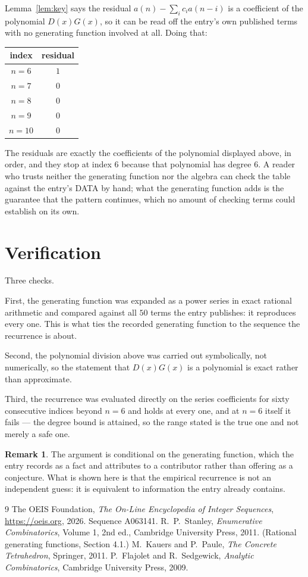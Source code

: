 \documentclass[11pt,a4paper]{article}
\theoremstyle{plain}
\theoremstyle{definition}
\newtheorem{remark}[theorem]{Remark}
\begin{document}
Lemma~\ref{lem:key} says the residual $a(n)-\sum_ic_ia(n-i)$ is a coefficient of the
polynomial $D(x)G(x)$, so it can be read off the entry's own published terms with no
generating function involved at all. Doing that:
\begin{center}
\begin{tabular}{cc}
index & residual \\ \hline
$n=6$ & $1$ \\
$n=7$ & $0$ \\
$n=8$ & $0$ \\
$n=9$ & $0$ \\
$n=10$ & $0$
\end{tabular}
\end{center}
The residuals are exactly the coefficients of the polynomial displayed above, in order, and
they stop at index $6$ because that polynomial has degree $6$. A reader who trusts
neither the generating function nor the algebra can check the table against the entry's DATA
by hand; what the generating function adds is the guarantee that the pattern continues, which
no amount of checking terms could establish on its own.

\section{Verification}

Three checks.

First, the generating function was expanded as a power series in exact rational arithmetic and
compared against all $50$ terms the entry publishes: it reproduces every one. This is
what ties the recorded generating function to the sequence the recurrence is about.

Second, the polynomial division above was carried out symbolically, not numerically, so the
statement that $D(x)G(x)$ is a polynomial is exact rather than approximate.

Third, the recurrence was evaluated directly on the series coefficients for sixty consecutive
indices beyond $n=6$ and holds at every one, and at $n=6$ itself it fails --- the
degree bound is attained, so the range stated is the true one and not merely a safe one.

\begin{remark}
The argument is conditional on the generating function, which the entry records as a fact and
attributes to a contributor rather than offering as a conjecture. What is shown here is that
the empirical recurrence is not an independent guess: it is equivalent to information the
entry already contains.
\end{remark}

\begin{thebibliography}{9}
 The OEIS Foundation, \emph{The On-Line Encyclopedia of Integer
Sequences}, \url{https://oeis.org}, 2026. Sequence A063141.
 R.~P.~Stanley, \emph{Enumerative Combinatorics}, Volume 1, 2nd ed.,
Cambridge University Press, 2011. (Rational generating functions, Section 4.1.)
 M.~Kauers and P.~Paule, \emph{The Concrete Tetrahedron}, Springer, 2011.
 P.~Flajolet and R.~Sedgewick, \emph{Analytic Combinatorics}, Cambridge
University Press, 2009.
\end{thebibliography}
\end{document}
